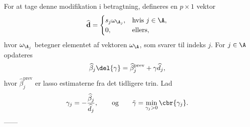 For at tage denne modifikation i betragtning, defineres en \(p \times 1\) vektor
\begin{align*}
\widehat{\mathbf{d}} = \begin{cases}
s_j \omega_{\A_j}, &\text{hvis } j \in \A, \\
0, & \text{ellers},
\end{cases}
\end{align*}
hvor \(\omega_{\A_j}\) betegner elementet af vektoren \(\omega_{\A}\), som svarer til indeks \(j\).
For \(j \in \A\) opdateres
\begin{align*}
\widehat{\beta}_j \del{\gamma} = \widehat{\beta}_j^\text{prev} + \gamma \widehat{d}_j,
\end{align*}
hvor \(\widehat{\beta}_j^\text{prev}\) er lasso estimaterne fra det tidligere trin.
Lad 
\begin{align*}
\gamma_j = -\frac{\widehat{\beta}_j}{\widehat{d}_j}, \qquad \text{og} \qquad \tilde{\gamma} = \min_{\gamma_j > 0} \cbr{\gamma_j}.
\end{align*}
------
%

